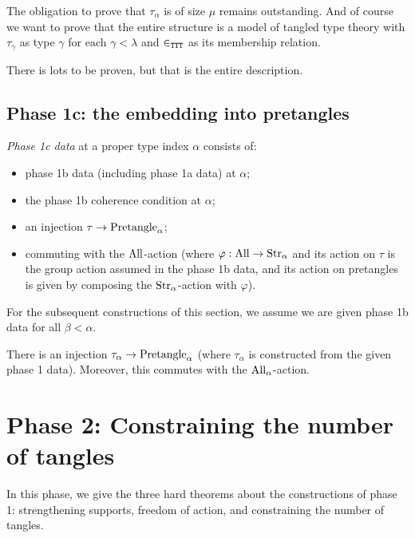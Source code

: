 The obligation to prove that $\tau_\alpha$ is of size $\mu$ remains outstanding.  And of course we want to prove that the entire structure is a model of tangled type theory with $\tau_\gamma$ as type $\gamma$ for each $\gamma<\lambda$ and $\in_{\tt TTT}$ as its membership relation.

There is lots to be proven, but that is the entire description.

\section{Phase 1c: the embedding into pretangles}

\begin{definition}
  \label{def:phase-1c-data}
  \emph{Phase 1c data} at a proper type index $\alpha$ consists of:
  \begin{itemize}
  \item phase 1b data (including phase 1a data) at $\alpha$;
  \item the phase 1b coherence condition at $\alpha$;
  \item an injection $\tau \to \mathrm{Pretangle}_\alpha$;
  \item commuting with the $\mathrm{All}$-action (where $\varphi : \mathrm{All} \to \mathrm{Str}_\alpha$ and its action on $\tau$ is the group action assumed in the phase 1b data, and its action on pretangles is given by composing the $\mathrm{Str}_\alpha$-action with $\varphi$).
  \end{itemize}

  For the subsequent constructions of this section, we assume we are given phase 1b data for all $\beta < \alpha$.
\end{definition}

\begin{definition}
  \label{def:embedding-into-pretangles}
  There is an injection $\tau_\alpha \to \mathrm{Pretangle}_\alpha$ (where $\tau_\alpha$ is constructed from the given phase 1 data).  Moreover, this commutes with the $\mathrm{All}_\alpha$-action.
\end{definition}

\newpage

\chapter{Phase 2: Constraining the number of tangles}

In this phase, we give the three hard theorems about the constructions of phase 1: strengthening supports, freedom of action, and constraining the number of tangles.

